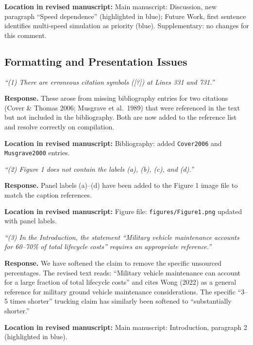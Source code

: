 \documentclass[11pt]{article}
\newcommand{\revquote}[1]{\medskip\noindent\textit{``#1''}\medskip}
\newcommand{\revloc}[1]{\noindent\textbf{Location in revised manuscript:} #1\medskip}
\begin{document}
\revloc{Main manuscript: Discussion, new paragraph ``Speed dependence'' (highlighted in blue); Future Work, first sentence identifies multi-speed simulation as priority (blue). Supplementary: no changes for this comment.}

\bigskip

\subsection*{Formatting and Presentation Issues}

\revquote{(1) There are erroneous citation symbols ([?]) at Lines 331 and 731.}

\noindent\textbf{Response.} These arose from missing bibliography entries for two citations (Cover \& Thomas 2006; Musgrave et al.\ 1989) that were referenced in the text but not included in the bibliography. Both are now added to the reference list and resolve correctly on compilation.

\revloc{Bibliography: added \texttt{Cover2006} and \texttt{Musgrave2000} entries.}

\bigskip

\revquote{(2) Figure 1 does not contain the labels (a), (b), (c), and (d).}

\noindent\textbf{Response.} Panel labels (a)--(d) have been added to the Figure 1 image file to match the caption references.

\revloc{Figure file: \texttt{figures/Figure1.png} updated with panel labels.}

\bigskip

\revquote{(3) In the Introduction, the statement ``Military vehicle maintenance accounts for 60--70\% of total lifecycle costs'' requires an appropriate reference.}

\noindent\textbf{Response.} We have softened the claim to remove the specific unsourced percentages. The revised text reads: ``Military vehicle maintenance can account for a large fraction of total lifecycle costs'' and cites Wong (2022) as a general reference for military ground vehicle maintenance considerations. The specific ``3--5 times shorter'' trucking claim has similarly been softened to ``substantially shorter.''

\revloc{Main manuscript: Introduction, paragraph 2 (highlighted in blue).}

\bigskip
\end{document}
